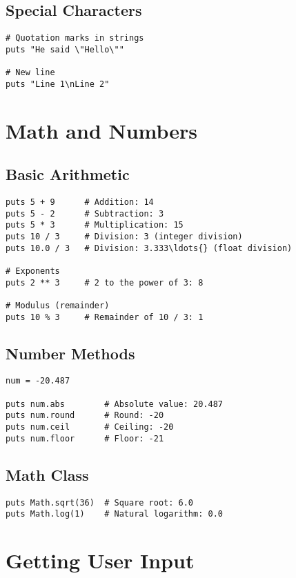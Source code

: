 \documentclass[12pt,a4paper]{article}
\begin{document}
\subsection{Special Characters}

\begin{lstlisting}
# Quotation marks in strings
puts "He said \"Hello\""

# New line
puts "Line 1\nLine 2"
\end{lstlisting}

\section{Math and Numbers}

\subsection{Basic Arithmetic}

\begin{lstlisting}
puts 5 + 9      # Addition: 14
puts 5 - 2      # Subtraction: 3
puts 5 * 3      # Multiplication: 15
puts 10 / 3     # Division: 3 (integer division)
puts 10.0 / 3   # Division: 3.333\ldots{} (float division)

# Exponents
puts 2 ** 3     # 2 to the power of 3: 8

# Modulus (remainder)
puts 10 % 3     # Remainder of 10 / 3: 1
\end{lstlisting}

\subsection{Number Methods}

\begin{lstlisting}
num = -20.487

puts num.abs        # Absolute value: 20.487
puts num.round      # Round: -20
puts num.ceil       # Ceiling: -20
puts num.floor      # Floor: -21
\end{lstlisting}

\subsection{Math Class}

\begin{lstlisting}
puts Math.sqrt(36)  # Square root: 6.0
puts Math.log(1)    # Natural logarithm: 0.0
\end{lstlisting}

\section{Getting User Input}
\end{document}
